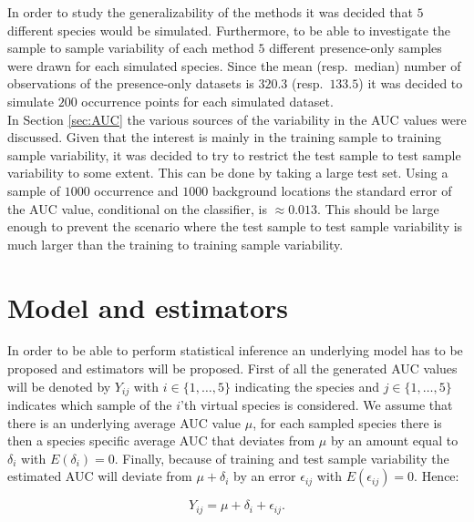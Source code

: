 In order to study the generalizability of the methods it was decided that $5$ different species would be simulated. Furthermore, to be able to investigate the sample to sample variability of each method $5$ different presence-only samples were drawn for each simulated species. Since the mean (resp.\ median) number of observations of the presence-only datasets is $320.3$ (resp.\ $133.5$) it was decided to simulate $200$ occurrence points for each simulated dataset. \\

In Section \ref{sec:AUC} the various sources of the variability in the AUC values were discussed. Given that the interest is mainly in the training sample to training sample variability, it was decided to try to restrict the test sample to test sample variability to some extent. This can be done by taking a large test set. Using a sample of $1000$ occurrence and $1000$ background locations the standard error of the AUC value, conditional on the classifier, is $\approx 0.013$. This should be large enough to prevent the scenario where the test sample to test sample variability is much larger than the training to training sample variability.

\section{Model and estimators}
\label{sec:Estimators}
In order to be able to perform statistical inference an underlying model has to be proposed and estimators will be proposed. First of all the generated AUC values will be denoted by $Y_{ij}$ with $i \in \{1,\ldots,5\}$ indicating the species and $j \in \{1,\ldots,5\}$ indicates which sample of the $i$'th virtual species is considered. We assume that there is an underlying average AUC value $\mu$, for each sampled species there is then a species specific average AUC that deviates from $\mu$ by an amount equal to $\delta_i$ with $E(\delta_i) = 0$. Finally, because of training and test sample variability the estimated AUC will deviate from $\mu + \delta_i$ by an error $\epsilon_{ij}$ with $E(\epsilon_{ij}) = 0$. Hence:

\begin{equation}
\label{eq:SimModel}
Y_{ij} = \mu + \delta_i + \epsilon_{ij}.
\end{equation}

